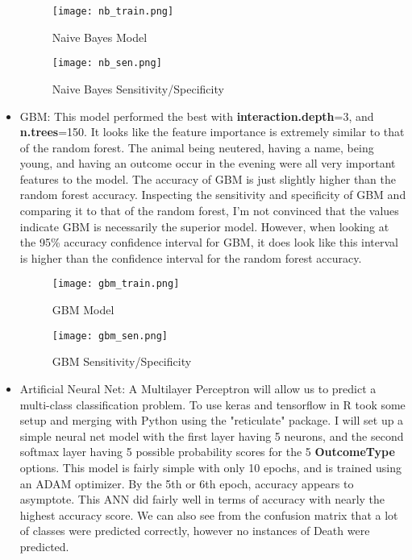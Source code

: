 \documentclass[12pt]{article} %
\begin{document}
\begin{itemize}
\begin{figure}[h!]
  \centering
  \texttt{[image: nb\_train.png]}                  
  \caption{Naive Bayes Model}
  \label{fig:KNN Model}
\end{figure}

\begin{figure}[h!]
  \centering
  \texttt{[image: nb\_sen.png]}                  
  \caption{Naive Bayes Sensitivity/Specificity}
  \label{fig:KNN Model}
\end{figure}



\item GBM: This model performed the best with \textbf{interaction.depth}=3, and \textbf{n.trees}=150. It looks like the feature importance is extremely similar to that of the random forest. The animal being neutered, having a name, being young, and having an outcome occur in the evening were all very important features to the model. The accuracy of GBM is just slightly higher than the random forest accuracy. Inspecting the sensitivity and specificity of GBM and comparing it to that of the random forest, I'm not convinced that the values indicate GBM is necessarily the superior model. However, when looking at the 95\% accuracy confidence interval for GBM, it does look like this interval is higher than the confidence interval for the random forest accuracy. 

\begin{figure}[h!]
  \centering
  \texttt{[image: gbm\_train.png]}                  
  \caption{GBM Model}
  \label{fig:GBM Model}
\end{figure}

\begin{figure}[!h!]
  \centering
  \texttt{[image: gbm\_sen.png]}                  
  \caption{GBM Sensitivity/Specificity}
  \label{fig:DecisionTree}
\end{figure}

\vspace*{5.5 cm}

\item Artificial Neural Net: A Multilayer Perceptron will allow us to predict a multi-class classification problem. To use keras and tensorflow in R took some setup and merging with Python using the "reticulate" package. I will set up a simple neural net model with the first layer having 5 neurons, and the second softmax layer having 5 possible probability scores for the 5 \textbf{OutcomeType} options. This model is fairly simple with only 10 epochs, and is trained using an ADAM optimizer. By the 5th or 6th epoch, accuracy appears to asymptote. This ANN did fairly well in terms of accuracy with nearly the highest accuracy score. We can also see from the confusion matrix that a lot of classes were predicted correctly, however no instances of Death were predicted. 


\end{itemize}
\end{document}

